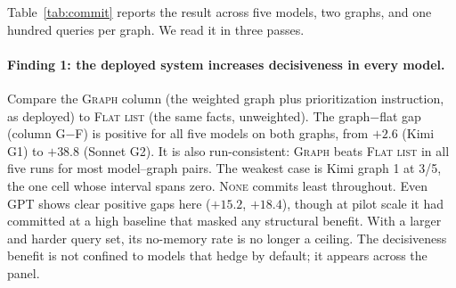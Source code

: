 \documentclass[11pt]{article}
\begin{document}
\begin{table}[t]
\caption{Left: mean commit rate (of 100 priority queries) over five runs, by model, graph, and condition. Right: the three single-contrast gaps against \textsc{Flat list}, on commit rate and on correctness per scorable query --- \textbf{Fi$-$F} = instruction only (flat list plus instruction), \textbf{Gn$-$F} = structure only (graph with instruction removed), \textbf{G$-$F} = the deployed system (both). \textbf{Bold} marks a gap whose 95\% percentile bootstrap interval excludes zero, paired by query over 10{,}000 resamples; the intervals, two-sided $p$ values, and run consistency behind every bolded and unbolded entry are in Appendices~\ref{app:ci} and~\ref{app:followup}. Correctness is scored only on the queries whose ground-truth weight margin exceeds one decay step (96 of 100 on G1, 69 of 100 on G2); absolute correctness levels are in Table~\ref{tab:correct}. Decoding pinned at temperature 1.0 on every backend, graph reseeded from a pristine seed before every call, all conditions scored by the same frozen held-out-validated classifier. DeepSeek's G1 \textsc{Gr,neut} cell is omitted: the model returned recurring empty responses there (see text).}
\label{tab:commit}
\end{table}

Table~\ref{tab:commit} reports the result across five models, two graphs, and one hundred queries per graph. We read it in three passes.

\paragraph{Finding 1: the deployed system increases decisiveness in every model.} Compare the \textsc{Graph} column (the weighted graph plus prioritization instruction, as deployed) to \textsc{Flat list} (the same facts, unweighted). The graph$-$flat gap (column G$-$F) is positive for all five models on both graphs, from $+2.6$ (Kimi G1) to $+38.8$ (Sonnet G2). It is also run-consistent: \textsc{Graph} beats \textsc{Flat list} in all five runs for most model--graph pairs. The weakest case is Kimi graph 1 at 3/5, the one cell whose interval spans zero. \textsc{None} commits least throughout. Even GPT shows clear positive gaps here ($+15.2$, $+18.4$), though at pilot scale it had committed at a high baseline that masked any structural benefit. With a larger and harder query set, its no-memory rate is no longer a ceiling. The decisiveness benefit is not confined to models that hedge by default; it appears across the panel.
\end{document}
